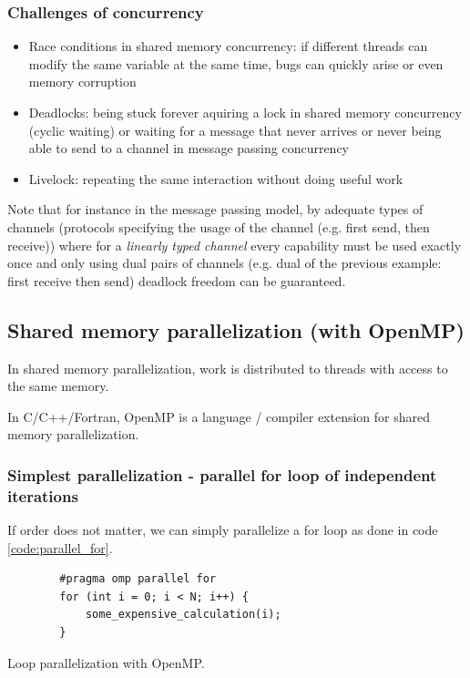 \subsubsection{Challenges of concurrency}
\begin{itemize}
    \item \textcolor{red1}{Race conditions in shared memory concurrency}: if 
    different threads can modify the same variable at the same time, bugs can 
    quickly arise or even memory corruption
    \item \textcolor{red1}{Deadlocks}: being stuck forever aquiring a lock in shared memory concurrency (cyclic waiting)
    or waiting for a message that never arrives or never being able to send to a channel in message passing concurrency
    \item \textcolor{red1}{Livelock}: repeating the same interaction without doing useful work
\end{itemize}
Note that for instance in the message passing model, by adequate types of channels
(protocols specifying the usage of the channel (e.g. first send, then receive)) where for a
\textit{linearly typed channel} every capability must be used exactly once and only using
dual pairs of channels (e.g. dual of the previous example: first receive then send) deadlock freedom can be guaranteed.

\subsection{Shared memory parallelization (with OpenMP)}
In shared memory parallelization, work is distributed to threads with access to the same memory.

In C/C++/Fortran, OpenMP is a language / compiler extension for shared memory parallelization.

\subsubsection{Simplest parallelization - parallel for loop of independent iterations}
If order does not matter, we can simply parallelize a for loop as done in code \ref{code:parallel_for}.

\begin{codebox}[!htb]
    \begin{verbatim}
        #pragma omp parallel for
        for (int i = 0; i < N; i++) {
            some_expensive_calculation(i);
        }
    \end{verbatim}
    \caption{Loop parallelization with OpenMP.}
    \label{code:parallel_for}
\end{codebox}


